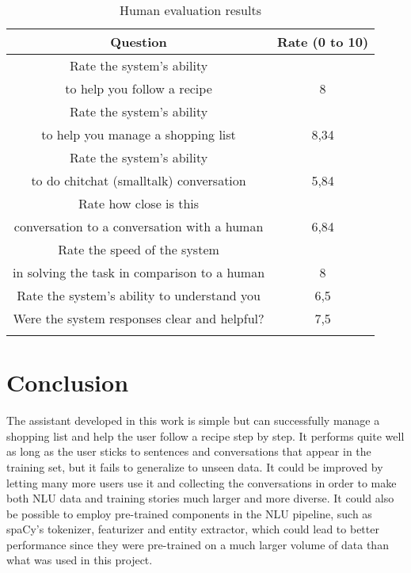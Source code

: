 \documentclass[journal, 11pt]{IEEEtran}
\begin{document}
\begin{table}[ht]
    \centering
    \begin{tabular}{@{}cc@{}}
        \toprule
        \textbf{Question}                                                           & \textbf{Rate (0 to 10)} \\ \midrule
        Rate the system's ability\\ to help you follow a recipe                     & 8                       \\
        Rate the system's ability\\ to help you manage a shopping list              & 8,34                    \\
        Rate the system's ability\\ to do chitchat (smalltalk) conversation         & 5,84                    \\
        Rate how close is this\\ conversation to a conversation with a human        & 6,84                    \\
        Rate the speed of the system\\ in solving the task in comparison to a human & 8                       \\
        Rate the system's ability to understand you                                 & 6,5                     \\
        Were the system responses clear and helpful?                                & 7,5                     \\ \bottomrule\\
    \end{tabular}
    \caption{Human evaluation results}
    \label{tab:human-eval}
\end{table}


\section{Conclusion}
The assistant developed in this work is simple but can successfully manage a shopping list and help the user follow a recipe step by step.
It performs quite well as long as the user sticks to sentences and conversations that appear in the training set, but it fails to generalize to unseen data.
It could be improved by letting many more users use it and collecting the conversations in order to make both NLU data and training stories much larger and more diverse.
It could also be possible to employ pre-trained components in the NLU pipeline, such as spaCy's \cite{spacy} tokenizer, featurizer and entity extractor, which could lead to better performance since they were pre-trained on a much larger volume of data than what was used in this project.
\end{document}

